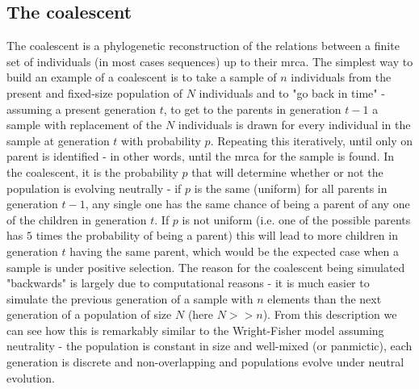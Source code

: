 \subsection{The coalescent}

The coalescent is a phylogenetic reconstruction of the relations between a finite set of individuals (in most cases sequences) up to their \ac{mrca}. The simplest way to build an example of a coalescent is to take a sample of $n$ individuals from the present and fixed-size population of $N$ individuals and to "go back in time" - assuming a present generation $t$, to get to the parents in generation $t-1$ a sample with replacement of the $N$ individuals is drawn for every individual in the sample at generation $t$ with probability $p$. Repeating this iteratively, until only on parent is identified - in other words, until the \ac{mrca} for the sample is found. In the coalescent, it is the probability $p$ that will determine whether or not the population is evolving neutrally - if $p$ is the same (uniform) for all parents in generation $t-1$, any single one has the same chance of being a parent of any one of the children in generation $t$. If $p$ is not uniform (i.e. one of the possible parents has $5$ times the probability of being a parent) this will lead to more children in generation $t$ having the same parent, which would be the expected case when a sample is under positive selection. The reason for the coalescent being simulated "backwards" is largely due to computational reasons - it is much easier to simulate the previous generation of a sample with $n$ elements than the next generation of a population of size $N$ (here $N>>n$). From this description we can see how this is remarkably similar to the Wright-Fisher model assuming neutrality - the population is constant in size and well-mixed (or panmictic), each generation is discrete and non-overlapping and populations evolve under neutral evolution. 


